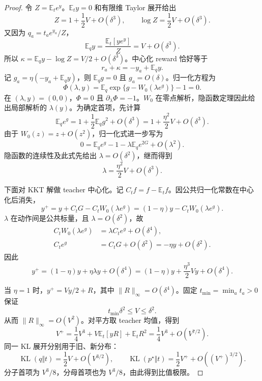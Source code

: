 \documentclass[lang=cn,scheme=chinese,openany]{../book/elegantbook}
\newcommand{\E}{\mathbb E}
\newcommand{\KL}{\operatorname{KL}}
\begin{document}
\begin{proof}
令 $Z=\E_te^y$。$\E_ty=0$ 和有限维 Taylor 展开给出
\begin{equation*}
 Z=1+\frac12V+O(\delta^3),\qquad
 \log Z=\frac12V+O(\delta^3).
\end{equation*}
又因为 $q_a=t_ae^{y_a}/Z$，
\begin{equation*}
 \E_qy=\frac{\E_t[y e^y]}{Z}=V+O(\delta^3).
\end{equation*}
所以 $\kappa=\E_qy-\log Z=V/2+O(\delta^3)$。中心化 reward 恰好等于
\begin{equation*}
 r_a+\kappa=-y_a+\E_qy.
\end{equation*}
记 $g_a=\eta(-y_a+\E_qy)$，则 $\E_qg=0$ 且 $g_a=O(\delta)$。归一化方程为
\begin{equation*}
 \Phi(\lambda,y)
 =\E_q\exp\{g-W_0(\lambda e^g)\}-1=0.
\end{equation*}
在 $(\lambda,y)=(0,0)$，$\Phi=0$ 且 $\partial_\lambda\Phi=-1$。$W_0$ 在零点解析，隐函数定理因此给出局部解析的 $\lambda(y)$。为确定首项，先计算
\begin{equation*}
 \E_qe^g=1+\frac12\E_qg^2+O(\delta^3)
 =1+\frac{\eta^2}{2}V+O(\delta^3).
\end{equation*}
由于 $W_0(z)=z+O(z^2)$，归一化式进一步写为
\begin{equation*}
 0=\E_qe^g-1-\lambda\E_qe^{2G}+O(\lambda^2).
\end{equation*}
隐函数的连续性及此式先给出 $\lambda=O(\delta^2)$，继而得到
\begin{equation*}
 \lambda=\frac{\eta^2}{2}V+O(\delta^3).
\end{equation*}

下面对 KKT 解做 teacher 中心化。记 $C_tf=f-\E_tf$。因公共归一化常数在中心化后消失，
\begin{equation*}
 y^+=y+C_tG-C_tW_0(\lambda e^g)
 =(1-\eta)y-C_tW_0(\lambda e^g).
\end{equation*}
$\lambda$ 在动作间是公共标量，且 $\lambda=O(\delta^2)$，故
\begin{align*}
 C_tW_0(\lambda e^g)
 &=\lambda C_te^g+O(\delta^4),\\
 C_te^g&=C_tG+O(\delta^2)
 =-\eta y+O(\delta^2).
\end{align*}
因此
\begin{equation*}
 y^+=(1-\eta)y+\eta\lambda y+O(\delta^4)
 =(1-\eta)y+\frac{\eta^3}{2}Vy+O(\delta^4).
\end{equation*}

当 $\eta=1$ 时，$y^+=Vy/2+R$，其中 $\|R\|_\infty=O(\delta^4)$。固定 $t_{\min}=\min_at_a>0$ 保证
\begin{equation*}
 t_{\min}\delta^2\le V\le\delta^2.
\end{equation*}
从而 $\|R\|_\infty=O(V^2)$。对平方取 teacher 均值，得到
\begin{equation*}
 V^+=\frac14V^3+V\E_t[yR]+\E_tR^2
 =\frac14V^3+O(V^{7/2}).
\end{equation*}
同一 KL 展开分别用于旧、新分布：
\begin{equation*}
 \KL(q\Vert t)=\frac12V+O(V^{3/2}),
 \qquad
 \KL(p^\star\Vert t)=\frac12V^++O((V^+)^{3/2}).
\end{equation*}
分子首项为 $V^3/8$，分母首项也为 $V^3/8$，由此得到比值极限。
\end{proof}
\end{document}
